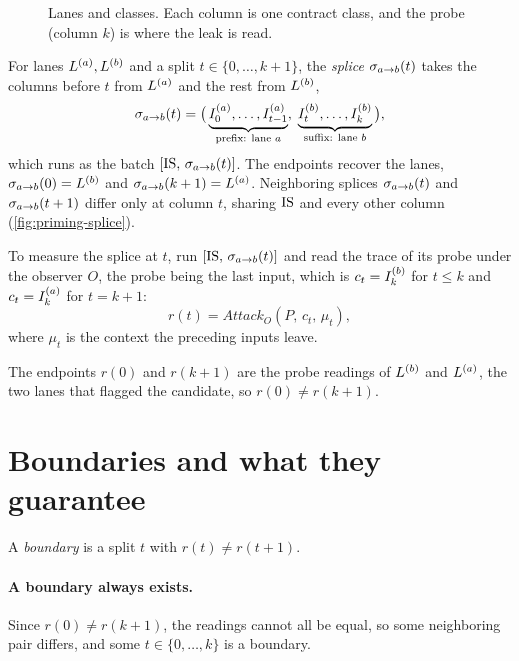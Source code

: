 \begin{figure}[t]
\centering
\fitwidth{}
\caption{Lanes and classes. Each column is one contract class, and the probe (column $k$) is where
the leak is read.}
\label{fig:priming-lanes}
\end{figure}

\begin{definition}[Splice]
\label{def:splice}
For lanes $L^{(a)},L^{(b)}$ and a split $t\in\{0,\dots,k+1\}$, the \emph{splice} $\sigma_{a\to b}(t)$ takes
the columns before $t$ from $L^{(a)}$ and the rest from $L^{(b)}$,
\begin{equation}
\sigma_{a\to b}(t)=\big(
  \underbrace{I_{0}^{(a)},\dots,I_{t-1}^{(a)}}_{\text{prefix: lane }a},\;
  \underbrace{I_{t}^{(b)},\dots,I_{k}^{(b)}}_{\text{suffix: lane }b}\big),
\label{eq:splice}
\end{equation}
which runs as the batch $[\mathrm{IS},\,\sigma_{a\to b}(t)]$. The endpoints recover the lanes, $\sigma_{a\to b}(0)=L^{(b)}$ and
$\sigma_{a\to b}(k+1)=L^{(a)}$. Neighboring splices $\sigma_{a\to b}(t)$ and $\sigma_{a\to b}(t+1)$ differ only at column $t$,
sharing $\mathrm{IS}$ and every other column (\autoref{fig:priming-splice}).
\end{definition}

\begin{definition}
\label{def:splice-measurement}
To measure the splice at $t$, run $[\mathrm{IS},\,\sigma_{a\to b}(t)]$ and read the trace of its probe under the
observer $O$, the probe being the last input, which is $c_t=I_{k}^{(b)}$ for $t\le k$ and
$c_t=I_{k}^{(a)}$ for $t=k+1$:
\begin{equation}
r(t)=\mathit{Attack}_{O}(P,\,c_t,\,\mu_t),
\label{eq:rt}
\end{equation}
where $\mu_t$ is the context the preceding inputs leave.
\end{definition}

The endpoints $r(0)$ and $r(k+1)$ are the probe readings of $L^{(b)}$ and $L^{(a)}$, the two lanes
that flagged the candidate, so $r(0)\neq r(k+1)$.

\section{Boundaries and what they guarantee}
\label{sec:priming-boundary}

A \emph{boundary} is a split $t$ with $r(t)\neq r(t+1)$.

\paragraph{A boundary always exists.} Since $r(0)\neq r(k+1)$, the readings cannot all be equal, so
some neighboring pair differs, and some $t\in\{0,\dots,k\}$ is a boundary.

